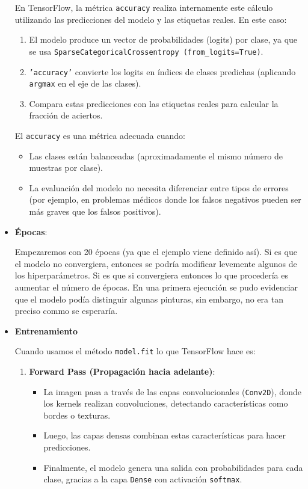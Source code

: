 \documentclass[../main.tex]{subfiles}
\begin{document}
\begin{itemize}
  En TensorFlow, la métrica \texttt{accuracy} realiza internamente este cálculo utilizando las predicciones del modelo y las etiquetas reales. En este caso:

  \begin{enumerate}
      \item El modelo produce un vector de probabilidades (logits) por clase, ya que se usa \texttt{SparseCategoricalCrossentropy (from\_logits=True)}.
      \item \texttt{'accuracy'} convierte los logits en índices de clases predichas (aplicando \texttt{argmax} en el eje de las clases).
      \item Compara estas predicciones con las etiquetas reales para calcular la fracción de aciertos.
  \end{enumerate}

  El \texttt{accuracy} es una métrica adecuada cuando:

  \begin{itemize}
      \item Las clases están balanceadas (aproximadamente el mismo número de muestras por clase).
      \item La evaluación del modelo no necesita diferenciar entre tipos de errores (por ejemplo, en problemas médicos donde los falsos negativos pueden ser más graves que los falsos positivos).

  \end{itemize}

  \item \textbf{Épocas}:
  
  Empezaremos con 20 épocas (ya que el ejemplo viene definido así). Si es que el modelo no convergiera, entonces se podría modificar levemente algunos de los hiperparámetros. Si es que si convergiera entonces lo que procedería es aumentar el número de épocas. En una primera ejecución se pudo evidenciar que el modelo podía distinguir algunas pinturas, sin embargo, no era tan preciso commo se esperaría.

  \item \textbf{Entrenamiento}
  
  Cuando usamos el método \texttt{model.fit} lo que TensorFlow hace es:
  \begin{enumerate}
      \item \textbf{Forward Pass (Propagación hacia adelante)}:
      \begin{itemize}
          \item La imagen pasa a través de las capas convolucionales (\texttt{Conv2D}), donde los kernels realizan convoluciones, detectando características como bordes o texturas.
          \item Luego, las capas densas combinan estas características para hacer predicciones.
          \item Finalmente, el modelo genera una salida con probabilidades para cada clase, gracias a la capa \texttt{Dense} con activación \texttt{softmax}.
      \end{itemize}


\end{enumerate}
\end{itemize}
\end{document}
